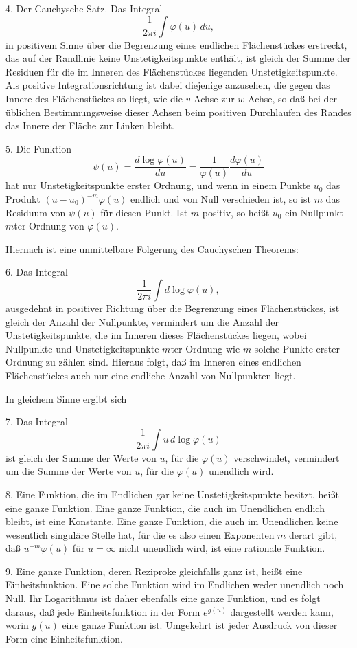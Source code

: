 \documentclass[11pt]{article}
\providecommand{\dd}{\,d}
\begin{document}
4. Der Cauchysche Satz. Das Integral
\[
\frac{1}{2\pi i}\int \varphi(u)\dd u,
\]
in positivem Sinne über die Begrenzung eines endlichen Flächenstückes erstreckt, das auf der Randlinie keine Unstetigkeitspunkte enthält, ist gleich der Summe der Residuen für die im Inneren des Flächenstückes liegenden Unstetigkeitspunkte. Als positive Integrationsrichtung ist dabei diejenige anzusehen, die gegen das Innere des Flächenstückes so liegt, wie die $v$-Achse zur $w$-Achse, so daß bei der üblichen Bestimmungsweise dieser Achsen beim positiven Durchlaufen des Randes das Innere der Fläche zur Linken bleibt.

5. Die Funktion
\[
\psi(u)=\frac{d\log\varphi(u)}{du}=\frac{1}{\varphi(u)}\frac{d\varphi(u)}{du}
\]
hat nur Unstetigkeitspunkte erster Ordnung, und wenn in einem Punkte $u_0$ das Produkt $(u-u_0)^{-m}\varphi(u)$ endlich und von Null verschieden ist, so ist $m$ das Residuum von $\psi(u)$ für diesen Punkt. Ist $m$ positiv, so heißt $u_0$ ein Nullpunkt $m$ter Ordnung von $\varphi(u)$.

Hiernach ist eine unmittelbare Folgerung des Cauchyschen Theorems:

6. Das Integral
\[
\frac{1}{2\pi i}\int d\log\varphi(u),
\]
ausgedehnt in positiver Richtung über die Begrenzung eines Flächenstückes, ist gleich der Anzahl der Nullpunkte, vermindert um die Anzahl der Unstetigkeitspunkte, die im Inneren dieses Flächenstückes liegen, wobei Nullpunkte und Unstetigkeitspunkte $m$ter Ordnung wie $m$ solche Punkte erster Ordnung zu zählen sind. Hieraus folgt, daß im Inneren eines endlichen Flächenstückes auch nur eine endliche Anzahl von Nullpunkten liegt.

In gleichem Sinne ergibt sich

7. Das Integral
\[
\frac{1}{2\pi i}\int u\,d\log\varphi(u)
\]
ist gleich der Summe der Werte von $u$, für die $\varphi(u)$ verschwindet, vermindert um die Summe der Werte von $u$, für die $\varphi(u)$ unendlich wird.

8. Eine Funktion, die im Endlichen gar keine Unstetigkeitspunkte besitzt, heißt eine ganze Funktion. Eine ganze Funktion, die auch im Unendlichen endlich bleibt, ist eine Konstante. Eine ganze Funktion, die auch im Unendlichen keine wesentlich singuläre Stelle hat, für die es also einen Exponenten $m$ derart gibt, daß $u^{-m}\varphi(u)$ für $u=\infty$ nicht unendlich wird, ist eine rationale Funktion.

9. Eine ganze Funktion, deren Reziproke gleichfalls ganz ist, heißt eine Einheitsfunktion. Eine solche Funktion wird im Endlichen weder unendlich noch Null. Ihr Logarithmus ist daher ebenfalls eine ganze Funktion, und es folgt daraus, daß jede Einheitsfunktion in der Form $e^{g(u)}$ dargestellt werden kann, worin $g(u)$ eine ganze Funktion ist. Umgekehrt ist jeder Ausdruck von dieser Form eine Einheitsfunktion.
\end{document}
